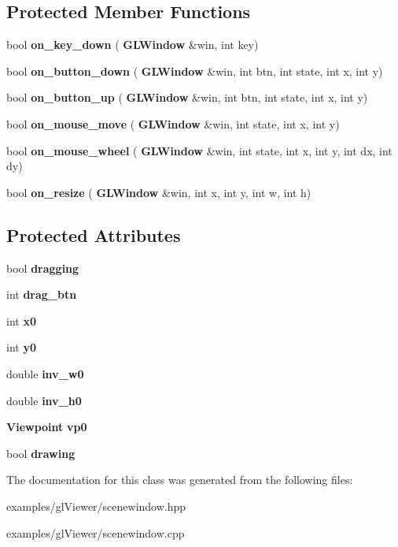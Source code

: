 \subsection*{Protected Member Functions}
\begin{DoxyCompactItemize}
\item 
\mbox{\label{classglwindow_1_1_scene_window_a1482ec985ea436cb29e8da14cf7c55b5}} 
bool {\bfseries on\+\_\+key\+\_\+down} (\textbf{ G\+L\+Window} \&win, int key)
\item 
\mbox{\label{classglwindow_1_1_scene_window_a75cabfd481bb531d37ee5637c207311e}} 
bool {\bfseries on\+\_\+button\+\_\+down} (\textbf{ G\+L\+Window} \&win, int btn, int state, int x, int y)
\item 
\mbox{\label{classglwindow_1_1_scene_window_a10c408229e2f6baea755a07e56a28644}} 
bool {\bfseries on\+\_\+button\+\_\+up} (\textbf{ G\+L\+Window} \&win, int btn, int state, int x, int y)
\item 
\mbox{\label{classglwindow_1_1_scene_window_a3c67279c10c4cff40aacac9571091f12}} 
bool {\bfseries on\+\_\+mouse\+\_\+move} (\textbf{ G\+L\+Window} \&win, int state, int x, int y)
\item 
\mbox{\label{classglwindow_1_1_scene_window_a0186ad496adbcc11ada5ac24f4d7f37d}} 
bool {\bfseries on\+\_\+mouse\+\_\+wheel} (\textbf{ G\+L\+Window} \&win, int state, int x, int y, int dx, int dy)
\item 
\mbox{\label{classglwindow_1_1_scene_window_a932e76733ea8d6197ec9453c1ef09553}} 
bool {\bfseries on\+\_\+resize} (\textbf{ G\+L\+Window} \&win, int x, int y, int w, int h)
\end{DoxyCompactItemize}
\subsection*{Protected Attributes}
\begin{DoxyCompactItemize}
\item 
\mbox{\label{classglwindow_1_1_scene_window_a7d77c829486011d04815eeb114919d71}} 
bool {\bfseries dragging}
\item 
\mbox{\label{classglwindow_1_1_scene_window_aeb7b1933324b7e32ef1c27496e398843}} 
int {\bfseries drag\+\_\+btn}
\item 
\mbox{\label{classglwindow_1_1_scene_window_a92ed7e285bc0c1f72bbe34830c2fa839}} 
int {\bfseries x0}
\item 
\mbox{\label{classglwindow_1_1_scene_window_a5a7ef8f289c9ef5d4546099724bfff77}} 
int {\bfseries y0}
\item 
\mbox{\label{classglwindow_1_1_scene_window_a261ceaff788f0d6c2d01ca71d2b268c7}} 
double {\bfseries inv\+\_\+w0}
\item 
\mbox{\label{classglwindow_1_1_scene_window_acb85c5bbf1a1e7152b5518c298e9e6cb}} 
double {\bfseries inv\+\_\+h0}
\item 
\mbox{\label{classglwindow_1_1_scene_window_a331e548ff2c83c970ca9ebddcd04581c}} 
\textbf{ Viewpoint} {\bfseries vp0}
\item 
\mbox{\label{classglwindow_1_1_scene_window_a93a5025d20cd92db7bf541764fe32b93}} 
bool {\bfseries drawing}
\end{DoxyCompactItemize}


The documentation for this class was generated from the following files\+:\begin{DoxyCompactItemize}
\item 
examples/gl\+Viewer/scenewindow.\+hpp\item 
examples/gl\+Viewer/scenewindow.\+cpp\end{DoxyCompactItemize}
